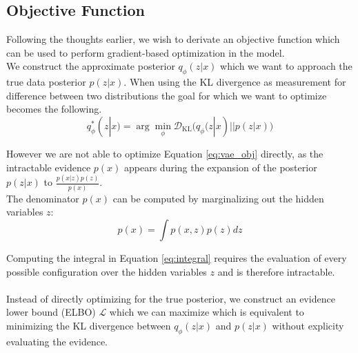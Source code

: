 \subsection{Objective Function}
Following the thoughts earlier, we wish to derivate an objective function which can be used to perform gradient-based optimization in the model.\\
We construct the approximate posterior $q_\phi(z|x)$ which we want to approach the true data posterior $p(z|x)$.
When using the KL divergence as measurement for difference between two distributions the goal for which we want to optimize becomes the following.
\begin{equation}
  \label{eq:vae_obj}
  q_\phi^{*}(z|x) = \arg\min_{\phi} \mathcal{D}_{\mathrm{KL}} \big(q_\phi(z|x) || p(z|x)\big)
\end{equation}

However we are not able to optimize Equation \ref{eq:vae_obj} directly, as the intractable evidence $p(x)$ appears during the expansion of the posterior $p(z|x)$ to $\frac{p(x|z)p(z)}{p(x)}$.\\
The denominator $p(x)$ can be computed by marginalizing out the hidden variables $z$: 
\begin{equation}
  \label{eq:integral}
p(x) = \int p(x,z) p(z) dz
\end{equation}

Computing the integral in Equation \ref{eq:integral} requires the evaluation of every possible configuration over the hidden variables $z$ and is therefore intractable.\\\\

Instead of directly optimizing for the true posterior, we construct an evidence lower bound (ELBO) $\mathcal{L}$ which we can maximize which is equivalent to minimizing the KL divergence between $q_\phi(z|x)$ and $p(z|x)$ without explicity evaluating the evidence.\\



